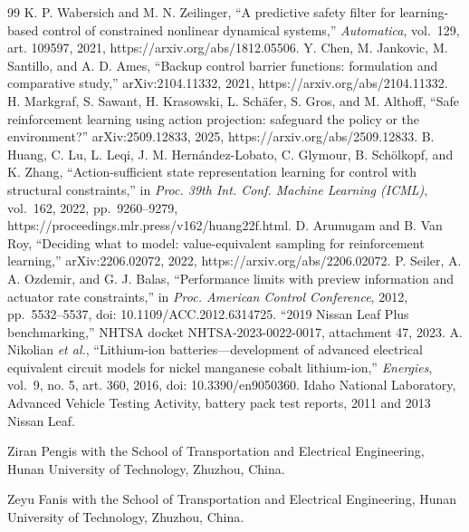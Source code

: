 \documentclass[letterpaper,journal]{IEEEtran}
\begin{document}
\begin{thebibliography}{99}
 K. P. Wabersich and M. N. Zeilinger, ``A predictive safety filter for learning-based control of constrained nonlinear dynamical systems,'' \emph{Automatica}, vol.~129, art. 109597, 2021, https://arxiv.org/abs/1812.05506.
 Y. Chen, M. Jankovic, M. Santillo, and A. D. Ames, ``Backup control barrier functions: formulation and comparative study,'' arXiv:2104.11332, 2021, https://arxiv.org/abs/2104.11332.
 H. Markgraf, S. Sawant, H. Krasowski, L. Schäfer, S. Gros, and M. Althoff, ``Safe reinforcement learning using action projection: safeguard the policy or the environment?'' arXiv:2509.12833, 2025, https://arxiv.org/abs/2509.12833.
 B. Huang, C. Lu, L. Leqi, J. M. Hernández-Lobato, C. Glymour, B. Schölkopf, and K. Zhang, ``Action-sufficient state representation learning for control with structural constraints,'' in \emph{Proc. 39th Int. Conf. Machine Learning (ICML)}, vol.~162, 2022, pp.~9260--9279, https://proceedings.mlr.press/v162/huang22f.html.
 D. Arumugam and B. Van Roy, ``Deciding what to model: value-equivalent sampling for reinforcement learning,'' arXiv:2206.02072, 2022, https://arxiv.org/abs/2206.02072.
 P. Seiler, A. A. Ozdemir, and G. J. Balas, ``Performance limits with preview information and actuator rate constraints,'' in \emph{Proc. American Control Conference}, 2012, pp.~5532--5537, doi: 10.1109/ACC.2012.6314725.
 ``2019 Nissan Leaf Plus benchmarking,'' NHTSA docket NHTSA-2023-0022-0017, attachment 47, 2023.
 A. Nikolian \emph{et al.}, ``Lithium-ion batteries---development of advanced electrical equivalent circuit models for nickel manganese cobalt lithium-ion,'' \emph{Energies}, vol.~9, no. 5, art. 360, 2016, doi: 10.3390/en9050360.
 Idaho National Laboratory, Advanced Vehicle Testing Activity, battery pack test reports, 2011 and 2013 Nissan Leaf.
\end{thebibliography}
\begin{IEEEbiographynophoto}{Ziran Peng}is with the School of Transportation and Electrical Engineering, Hunan University of Technology, Zhuzhou, China.\end{IEEEbiographynophoto}
\begin{IEEEbiographynophoto}{Zeyu Fan}is with the School of Transportation and Electrical Engineering, Hunan University of Technology, Zhuzhou, China.\end{IEEEbiographynophoto}
\end{document}
